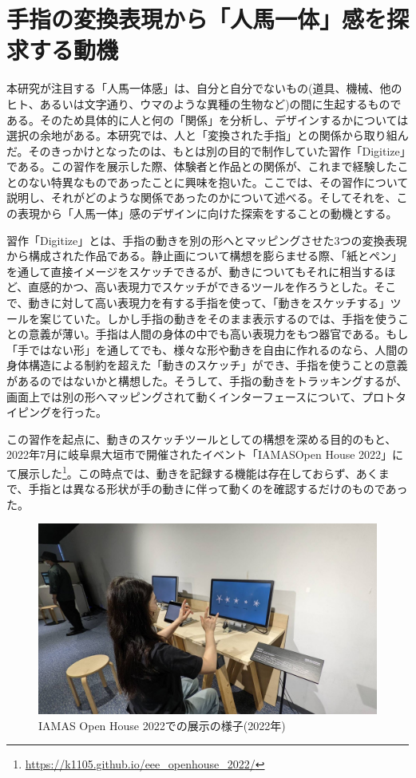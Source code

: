 \section{手指の変換表現から「人馬一体」感を探求する動機}
\label{prototyping_concept_making}
本研究が注目する「人馬一体感」は、自分と自分でないもの(道具、機械、他のヒト、あるいは文字通り、ウマのような異種の生物など)の間に生起するものである。そのため具体的に人と何の「関係」を分析し、デザインするかについては選択の余地がある。本研究では、人と「変換された手指」との関係から取り組んだ。そのきっかけとなったのは、もとは別の目的で制作していた習作「Digitize」である。この習作を展示した際、体験者と作品との関係が、これまで経験したことのない特異なものであったことに興味を抱いた。ここでは、その習作について説明し、それがどのような関係であったのかについて述べる。そしてそれを、この表現から「人馬一体」感のデザインに向けた探索をすることの動機とする。

習作「Digitize」とは、手指の動きを別の形へとマッピングさせた3つの変換表現から構成された作品である。静止画について構想を膨らませる際、「紙とペン」を通して直接イメージをスケッチできるが、動きについてもそれに相当するほど、直感的かつ、高い表現力でスケッチができるツールを作ろうとした。そこで、動きに対して高い表現力を有する手指を使って、「動きをスケッチする」ツールを案じていた。しかし手指の動きをそのまま表示するのでは、手指を使うことの意義が薄い。手指は人間の身体の中でも高い表現力をもつ器官である。もし「手ではない形」を通してでも、様々な形や動きを自由に作れるのなら、人間の身体構造による制約を超えた「動きのスケッチ」ができ、手指を使うことの意義があるのではないかと構想した。そうして、手指の動きをトラッキングするが、画面上では別の形へマッピングされて動くインターフェースについて、プロトタイピングを行った。

この習作を起点に、動きのスケッチツールとしての構想を深める目的のもと、2022年7月に岐阜県大垣市で開催されたイベント「IAMASOpen House 2022」にて展示した\footnote{\url{https://k1105.github.io/eee_openhouse_2022/}}。この時点では、動きを記録する機能は存在しておらず、あくまで、手指とは異なる形状が手の動きに伴って動くのを確認するだけのものであった。

\begin{figure}[H]
  \centering
  \includegraphics[width=15cm]{img/openhouse2022.jpeg}
  \caption{IAMAS Open House 2022での展示の様子(2022年)}
  \label{fig:exhibit_2022}
\end{figure}

